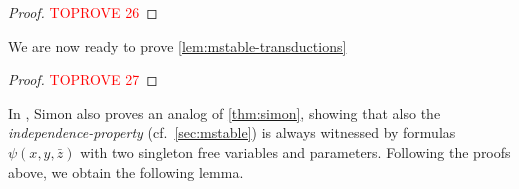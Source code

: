 \documentclass[11pt]{article}      \usepackage[margin=1in]{geometry}  \usepackage{microtype}
\theoremstyle{definition}
\begin{document}
\begin{proof}\textcolor{red}{TOPROVE 26}\end{proof}

We are now ready to prove \cref{lem:mstable-transductions}
\begin{proof}\textcolor{red}{TOPROVE 27}\end{proof}

In \cite{simon2021note}, Simon also proves an analog of \cref{thm:simon}, showing that also the \emph{independence-property} (cf.\ \cref{sec:mstable}) is always witnessed by formulas~$\psi(x,y,\bar z)$ with two singleton free variables and parameters.
Following the proofs above, we obtain the following lemma.

\lemMdepTransductions*

 
\end{document}
